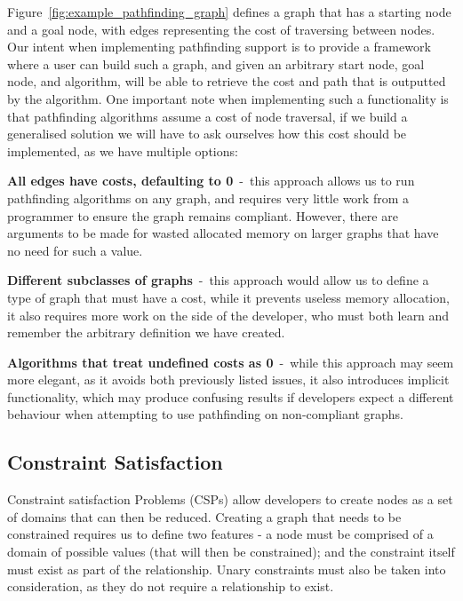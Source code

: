 Figure~\ref{fig:example_pathfinding_graph} defines a graph that has a starting node and a goal node, with edges
representing the cost of traversing between nodes.
Our intent when implementing pathfinding support is to provide a framework where a user can build such a graph, and
given an arbitrary start node, goal node, and algorithm, will be able to retrieve the cost and path that is outputted by
the algorithm.
One important note when implementing such a functionality is that pathfinding algorithms assume a cost of node
traversal, if we build a generalised solution we will have to ask ourselves how this cost should be implemented, as we
have multiple options:

\textbf{All edges have costs, defaulting to 0}~-~this approach allows us to run pathfinding algorithms on any graph, and
requires very little work from a programmer to ensure the graph remains compliant.
However, there are arguments to be made for wasted allocated memory on larger graphs that have no need for such a value.

\textbf{Different subclasses of graphs}~-~this approach would allow us to define a type of graph that must have a cost,
while it prevents useless memory allocation, it also requires more work on the side of the developer, who must both
learn and remember the arbitrary definition we have created.

\textbf{Algorithms that treat undefined costs as 0}~-~while this approach may seem more elegant, as it avoids both
previously listed issues, it also introduces implicit functionality, which may produce confusing results if developers
expect a different behaviour when attempting to use pathfinding on non-compliant graphs.

\subsection{Constraint Satisfaction}\label{subsec:constraint-satisfaction}
Constraint satisfaction Problems (CSPs) allow developers to create nodes as a set of domains that can then be reduced.
Creating a graph that needs to be constrained requires us to define two features - a node must be comprised of a domain
of possible values (that will then be constrained); and the constraint itself must exist as part of the relationship.
Unary constraints must also be taken into consideration, as they do not require a relationship to exist.

